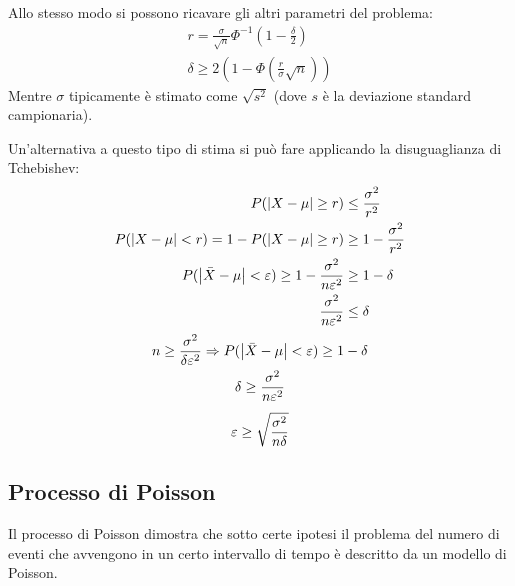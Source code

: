 Allo stesso modo si possono ricavare gli altri parametri del problema:
\begin{gather*}
	r = \frac{\sigma}{\sqrt{n}}\Phi^{-1}\left(1-\frac{\delta}{2}\right) \\
	\delta \geq 2\left(1-\Phi\left(\frac{r}{\sigma}\sqrt{n}\right)\right)
\end{gather*}
Mentre $\sigma$ tipicamente è stimato come $\sqrt{s^2}$ (dove $s$ è la deviazione standard campionaria).

Un'alternativa a questo tipo di stima si può fare applicando la disuguaglianza di Tchebishev:
\begin{align*}
	P(\left\lvert X-\mu \right\rvert\geq r)                                                       & \leq \frac{\sigma^2}{r^2}     \\
	P(\left\lvert X-\mu \right\rvert < r) = 1-P(\left\lvert X-\mu \right\rvert\geq r)                                & \geq 1 - \frac{\sigma^2}{r^2} \\
	P(\left\lvert \bar X-\mu \right\rvert < \varepsilon) \geq 1 - \frac{\sigma^2}{n\varepsilon^2} & \geq 1-\delta                 \\
	\frac{\sigma^2}{n\varepsilon^2}                                            & \leq \delta                   \\
\end{align*}
\begin{gather*}
	n \geq \frac{\sigma^2}{\delta\varepsilon^2} \Rightarrow P(\left\lvert \bar X-\mu \right\rvert<\varepsilon) \geq 1-\delta \\
	\delta\geq\frac{\sigma^2}{n\varepsilon^2} \\[1ex]
	\varepsilon \geq \sqrt{\frac{\sigma^2}{n\delta}}
\end{gather*}


\subsection{Processo di Poisson}
Il processo di Poisson dimostra che sotto certe ipotesi il problema del numero di eventi che avvengono in un certo intervallo di tempo è descritto da un modello di Poisson.

